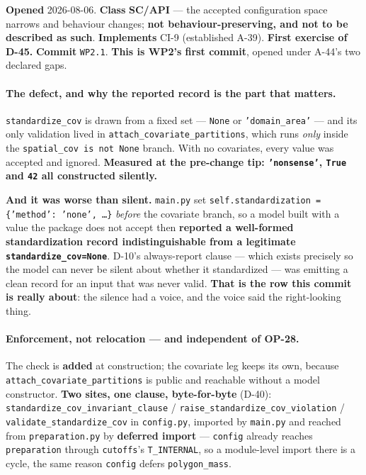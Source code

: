 \documentclass[
  10pt,
]{article}
\begin{document}
\textbf{Opened} 2026-08-06. \textbf{Class} \textbf{SC/API} --- the accepted configuration space narrows and behaviour changes; \textbf{not behaviour-preserving, and not to be described as such}. \textbf{Implements} CI-9 (established A-39). \textbf{First exercise of D-45.} \textbf{Commit} \texttt{WP2.1}. \textbf{This is WP2's first commit}, opened under A-44's two declared gaps.

\paragraph{The defect, and why the reported record is the part that matters.}
\texttt{standardize\_cov} is drawn from a fixed set --- \texttt{None} or \texttt{'domain\_area'} --- and its only validation lived in \texttt{attach\_covariate\_partitions}, which runs \emph{only} inside the \texttt{spatial\_cov is not None} branch. With no covariates, every value was accepted and ignored. \textbf{Measured at the pre-change tip: \texttt{'nonsense'}, \texttt{True} and \texttt{42} all constructed silently.}

\textbf{And it was worse than silent.} \texttt{main.py} set \texttt{self.standardization = \{'method': 'none', \dots\}} \emph{before} the covariate branch, so a model built with a value the package does not accept then \textbf{reported a well-formed standardization record indistinguishable from a legitimate \texttt{standardize\_cov=None}}. D-10's always-report clause --- which exists precisely so the model can never be silent about whether it standardized --- was emitting a clean record for an input that was never valid. \textbf{That is the row this commit is really about}: the silence had a voice, and the voice said the right-looking thing.

\paragraph{Enforcement, not relocation --- and independent of OP-28.}
The check is \textbf{added} at construction; the covariate leg keeps its own, because \texttt{attach\_covariate\_partitions} is public and reachable without a model constructor. \textbf{Two sites, one clause, byte-for-byte} (D-40): \texttt{standardize\_cov\_invariant\_clause} / \texttt{raise\_standardize\_cov\_violation} / \texttt{validate\_standardize\_cov} in \texttt{config.py}, imported by \texttt{main.py} and reached from \texttt{preparation.py} by \textbf{deferred import} --- \texttt{config} already reaches \texttt{preparation} through \texttt{cutoffs}'s \texttt{T\_INTERNAL}, so a module-level import there is a cycle, the same reason \texttt{config} defers \texttt{polygon\_mass}.
\end{document}
